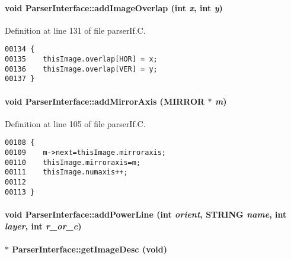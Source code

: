 \paragraph{\setlength{\rightskip}{0pt plus 5cm}void Parser\-Interface::add\-Image\-Overlap (int {\em x}, int {\em y})}\hfill



Definition at line 131 of file parser\-If.C.\small\begin{verbatim}00134 {
00135    thisImage.overlap[HOR] = x;
00136    thisImage.overlap[VER] = y;
00137 }
\end{verbatim}\normalsize 
\label{ParserInterface_a7}
\paragraph{\setlength{\rightskip}{0pt plus 5cm}void Parser\-Interface::add\-Mirror\-Axis ({\bf MIRROR} $\ast$ {\em m})}\hfill



Definition at line 105 of file parser\-If.C.\small\begin{verbatim}00108 {
00109    m->next=thisImage.mirroraxis;
00110    thisImage.mirroraxis=m;
00111    thisImage.numaxis++;
00112 
00113 }
\end{verbatim}\normalsize 
\label{ParserInterface_a14}
\paragraph{\setlength{\rightskip}{0pt plus 5cm}void Parser\-Interface::add\-Power\-Line (int {\em orient}, STRING {\em name}, int {\em layer}, int {\em r\_\-or\_\-c})}\hfill

\label{ParserInterface_a4}
\paragraph{ $\ast$ Parser\-Interface::get\-Image\-Desc (void)\hspace{0.3cm}{\tt  [inline]}}\hfill



